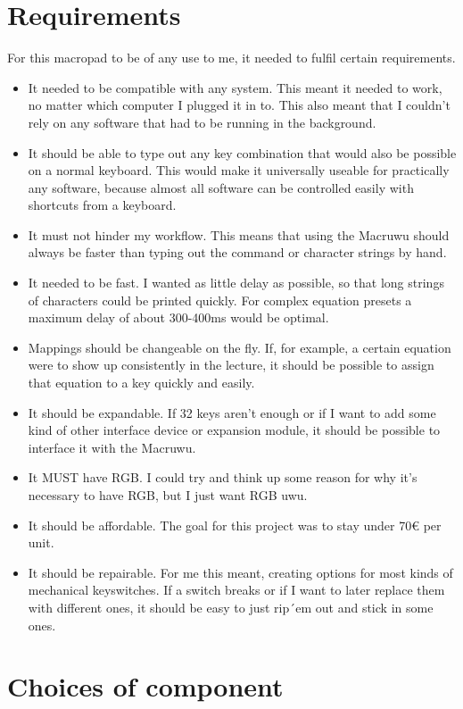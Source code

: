 \documentclass[english, 12pt]{scrartcl}
\begin{document}
	\section{Requirements}
	For this macropad to be of any use to me, it needed to fulfil certain requirements.
	\begin{itemize}
		\item It needed to be compatible with any system. This meant it needed to work, no matter which computer I plugged it in to. This also meant that I couldn't rely on any software that had to be running in the background.
		\item It should be able to type out any key combination that would also be possible on a normal keyboard. This would make it universally useable for practically any software, because almost all software can be controlled easily with shortcuts from a keyboard.
		\item It must not hinder my workflow. This means that using the Macruwu should always be faster than typing out the command or character strings by hand.
		\item It needed to be fast. I wanted as little delay as possible, so that long strings of characters could be printed quickly. For complex equation presets a maximum delay of about 300-400ms would be optimal.
		\item Mappings should be changeable on the fly. If, for example, a certain equation were to show up consistently in the lecture, it should be possible to assign that equation to a key quickly and easily.
		\item It should be expandable. If 32 keys aren't enough or if I want to add some kind of other interface device or expansion module, it should be possible to interface it with the Macruwu.
		\item It MUST have RGB. I could try and think up some reason for why it's necessary to have RGB, but I just want RGB uwu.
		\item It should be affordable. The goal for this project was to stay under 70€ per unit.
		\item It should be repairable. For me this meant, creating options for most kinds of mechanical keyswitches. If a switch breaks or if I want to later replace them with different ones, it should be easy to just rip´em out and stick in some ones.
	\end{itemize}
	\newpage
	\section{Choices of component}
\end{document}
